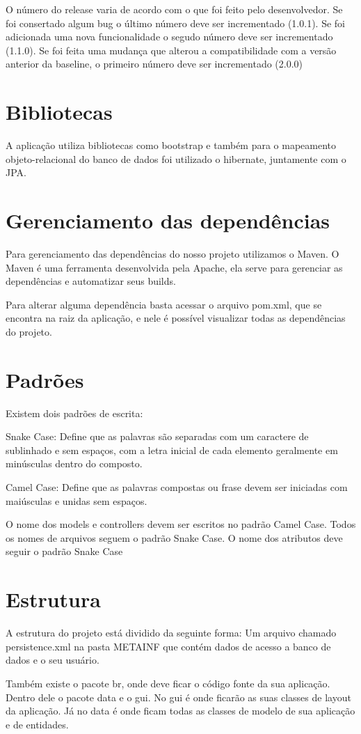 \documentclass[	DIV=calc,%
							paper=a4,%
							fontsize=12pt,%
							onecolumn]{scrartcl}	 					%
\begin{document}
O número do release varia de acordo com o que foi feito pelo desenvolvedor. Se foi consertado
algum bug o último número deve ser incrementado (1.0.1). Se foi adicionada uma nova funcionalidade o
segudo número deve ser incrementado (1.1.0). Se foi feita uma mudança que alterou a compatibilidade
com a versão anterior da baseline, o primeiro número deve ser incrementado (2.0.0)

\section {Bibliotecas}

A aplicação utiliza bibliotecas como bootstrap e também para o mapeamento objeto-relacional do banco de dados foi utilizado o hibernate, juntamente com o JPA.

\section {Gerenciamento das dependências}
Para gerenciamento das dependências do nosso projeto utilizamos o Maven. O Maven é uma ferramenta desenvolvida pela Apache, ela serve para gerenciar as dependências e automatizar seus builds.

Para alterar alguma dependência basta acessar o arquivo pom.xml, que se encontra na raiz da aplicação, e nele é possível visualizar todas as dependências do projeto.

\section{Padrões}

Existem dois padrões de escrita:

Snake Case: Define que as palavras são separadas com um caractere de sublinhado  e sem espaços,
com a letra inicial de cada elemento geralmente em minúsculas dentro do composto. 

Camel Case: Define que as palavras compostas ou frase devem ser iniciadas com maiúsculas e unidas
sem espaços. 

O nome dos models e controllers devem ser escritos no padrão Camel Case.
Todos os nomes de arquivos seguem o padrão Snake Case.
O nome dos atributos deve seguir o padrão Snake Case


\section {Estrutura}
A estrutura do projeto está dividido da seguinte forma: Um arquivo chamado persistence.xml na pasta METAINF que contém dados de acesso a banco de dados e o seu usuário.

Também existe o pacote br, onde deve ficar o código fonte da sua aplicação. Dentro dele o pacote data e o gui. No gui é onde ficarão as suas classes de layout da aplicação. Já no data é onde ficam todas as classes de modelo de sua aplicação e de entidades.
\end{document}
